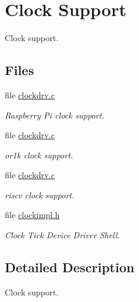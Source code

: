 \hypertarget{group__bsp__clock}{}\section{Clock Support}
\label{group__bsp__clock}


Clock support.  


\subsection*{Files}
\begin{DoxyCompactItemize}
\item 
file \mbox{\hyperlink{arm_2raspberrypi_2clock_2clockdrv_8c}{clockdrv.\+c}}
\begin{DoxyCompactList}\small\item\em Raspberry Pi clock support. \end{DoxyCompactList}\item 
file \mbox{\hyperlink{or1k_2generic__or1k_2clock_2clockdrv_8c}{clockdrv.\+c}}
\begin{DoxyCompactList}\small\item\em or1k clock support. \end{DoxyCompactList}\item 
file \mbox{\hyperlink{riscv_2riscv_2clock_2clockdrv_8c}{clockdrv.\+c}}
\begin{DoxyCompactList}\small\item\em riscv clock support. \end{DoxyCompactList}\item 
file \mbox{\hyperlink{clockimpl_8h}{clockimpl.\+h}}
\begin{DoxyCompactList}\small\item\em Clock Tick Device Driver Shell. \end{DoxyCompactList}\end{DoxyCompactItemize}


\subsection{Detailed Description}
Clock support. 

